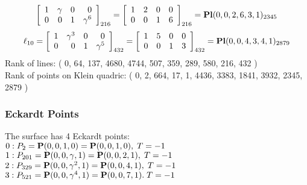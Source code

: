 \documentclass{article}
\newcommand{\bP}{{\bf P}}
\begin{document}
{$$\left[
\begin{array}{*{4}{r}}
1 & \gamma  & 0 & 0\\
0 & 0 & 1 & \gamma^{6}\\
\end{array}
\right]
_{216}
=
\left[
\begin{array}{*{4}c}
1  & 2  & 0  & 0\\
0  & 0  & 1  & 6\\
\end{array}
\right]_{216}
={\rm\bf Pl}(0,0,2,6,3,1 )_{2345}$$
$$
\ell_{10} = 
\left[
\begin{array}{*{4}{r}}
1 & \gamma^{3} & 0 & 0\\
0 & 0 & 1 & \gamma^{5}\\
\end{array}
\right]
_{432}
=
\left[
\begin{array}{*{4}c}
1  & 5  & 0  & 0\\
0  & 0  & 1  & 3\\
\end{array}
\right]_{432}
={\rm\bf Pl}(0,0,4,3,4,1 )_{2879}$$
Rank of lines: ( 0, 64, 137, 4680, 4744, 507, 359, 289, 580, 216, 432 )\\
Rank of points on Klein quadric: ( 0, 2, 664, 17, 1, 4436, 3383, 1841, 3932, 2345, 2879 )\\
\subsubsection*{Eckardt Points}
The surface has 4 Eckardt points:\\
$0 : P_{2}=\bP(0, 0, 1, 0) = \bP(0, 0, 1, 0),\; T= -1$\\
$1 : P_{201}=\bP(0, 0, \gamma , 1) = \bP(0, 0, 2, 1),\; T= -1$\\
$2 : P_{329}=\bP(0, 0, \gamma^{2}, 1) = \bP(0, 0, 4, 1),\; T= -1$\\
$3 : P_{521}=\bP(0, 0, \gamma^{4}, 1) = \bP(0, 0, 7, 1).\; T= -1$\\
}
\end{document}
